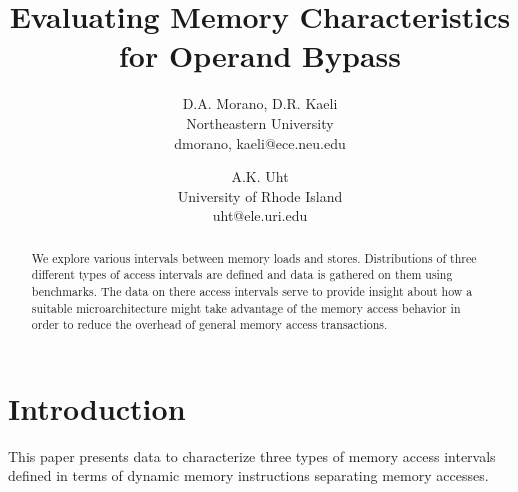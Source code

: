 %
\usepackage[english]{babel}
\usepackage{epsfig}
%
%
%
%
%
%
\textwidth 6.5in
\textheight 8.875in
\topmargin -0.4in
%
%
%

%
%
%
\title{Evaluating Memory Characteristics for Operand Bypass}
%
\author{
D.A. Morano, D.R. Kaeli\\
Northeastern University\\
{dmorano, kaeli}@ece.neu.edu\\
\and
A.K. Uht\\
University of Rhode Island\\ 
uht@ele.uri.edu
}
%
%
\date{}
%
\maketitle
%
%
%
\begin{abstract}
%
We explore various intervals between memory loads and stores.
Distributions of three different types of access intervals
are defined and data is gathered on them using benchmarks.
The data on there access intervals serve to provide insight
about how a suitable microarchitecture might take advantage
of the memory access behavior in order to reduce the overhead
of general memory access transactions.
%
\end{abstract}
%
%
\vspace{-0.25in}
\section{Introduction}
\vspace{-0.15in}
%
This paper presents data to characterize three types of
memory access intervals defined in terms of dynamic memory
instructions separating memory accesses.




